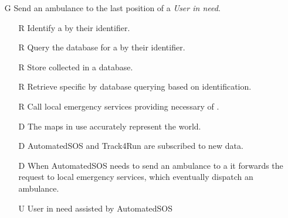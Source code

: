 \documentclass[../../rasd.tex]{subfiles}
\begin{document}
\begin{itemize}
            \item[G\subs{7}]Send an ambulance to the last position of a \textit{User in need}.
            \begin{itemize}
                \item[R\subs{6}]Identify a  by their identifier.
                \item[R\subs{7}]Query the database for a  by their identifier.
                \item[R\subs{11}]Store collected  in a database.
                \item[R\subs{12}]Retrieve specific  by database querying based on  identification.
                \item[R\subs{37}]Call local emergency services providing necessary  of .
                \\
                \item[D\subs{3}]The maps in use accurately represent the world.
                \item[D\subs{6}]AutomatedSOS and Track4Run are subscribed to new data.
                \item[D\subs{7}]When AutomatedSOS needs to send an ambulance to a  it forwards the request to local emergency services, which eventually dispatch an ambulance.
                \\
                \item[U\subs{11}]User in need assisted by AutomatedSOS
            \end{itemize}
        \end{itemize}
\end{document}
